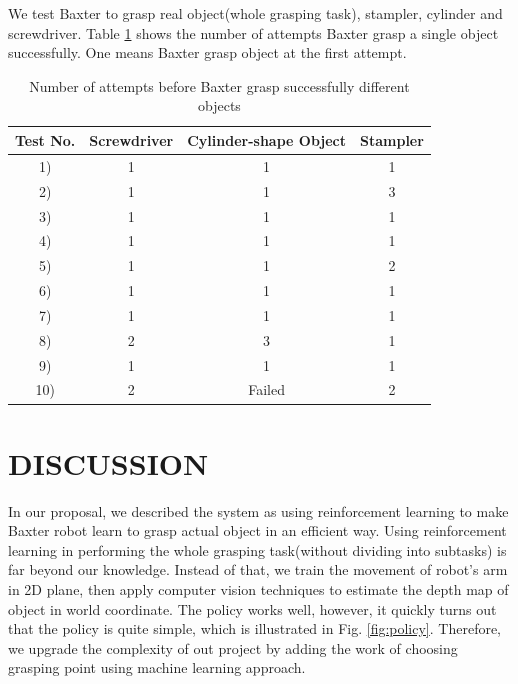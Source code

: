 \documentclass[a4paper, 10pt, conference]{ieeeconf}      %
\begin{document}
We test Baxter to grasp real object(whole grasping task), stampler, cylinder and screwdriver. Table \ref{grasptime} shows the number of attempts Baxter grasp a single object successfully. One means Baxter grasp object at the first attempt.  
\begin{table}[!htb]
	\centering
	\caption{Number of attempts before Baxter grasp successfully different objects}
	\label{grasptime}
	\begin{tabular}{c|c|c|c}
		
		\textbf{Test No.} & \textbf{Screwdriver} & \textbf{Cylinder-shape Object} & \textbf{Stampler} \\ \hline
		1)                & 1                    & 1                 & 1                \\ 
		2)                & 1                    & 1                 & 3                \\ 
		3)                & 1                    & 1                 & 1                \\ 
		4)                & 1                    & 1                 & 1                \\ 
		5)                & 1                    & 1                 & 2                \\ 
		6)                & 1                    & 1                 & 1                \\ 
		7)                & 1                    & 1                 & 1                \\ 
		8)                & 2                    & 3                 & 1                \\ 
		9)                & 1                    & 1                 & 1                \\ 
		10)               & 2                    & Failed               & 2                \\ 
	\end{tabular}
\end{table}
 
\section{DISCUSSION}
In our proposal, we described the system as using reinforcement learning to make Baxter robot learn to grasp actual object in an efficient way. Using reinforcement learning in performing the whole grasping task(without dividing into subtasks) is far beyond our knowledge. Instead of that, we train the movement of robot's arm in 2D plane, then apply computer vision techniques to estimate the depth map of object in world coordinate. The policy works well, however, it quickly turns out that the policy is quite simple, which is illustrated in Fig. \ref{fig:policy}. Therefore, we upgrade the complexity of out project by adding the work of choosing grasping point using machine learning approach. 
\end{document}

